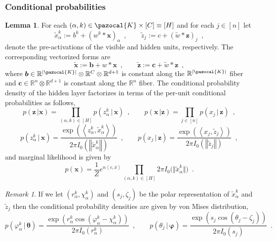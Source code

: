 \documentclass[12pt]{article}
\theoremstyle{definition}%
\newtheorem{lem}[thm]{Lemma}
\theoremstyle{definition}
\theoremstyle{remark}
\newtheorem*{remk}{Remark}
\begin{document}
\subsubsection{Conditional probabilities}
\begin{lem}\label{prop:conv_conditional}
For each $(\alpha , k) \in \pazocal{K} \times [C] \equiv [H]$ and for each $j \in [n]$ let
\begin{equation}
\tilde{x}_\alpha^k := b^k + (w^k \ast \bm{x})_\alpha \enspace , \quad \quad \tilde{z}_j := c + (\tilde{w} \ast \bm{z})_j \enspace ,
\end{equation}
denote the pre-activations of the visible and hidden units, respectively. The corresponding vectorized forms are
\begin{equation}
	\tilde{\bm{x}} := \bm{b} + w\ast \bm{x} \enspace , \quad \quad \tilde{\bm{z}} := \bm{c} + \tilde{w} \ast \bm{z} \enspace ,
\end{equation}
where $\bm{b} \in \mathbb{R}^{|\pazocal{K}|} \otimes \mathbb{R}^C \otimes \mathbb{R}^{d+1}$ is constant along the $\mathbb{R}^{|\pazocal{K}|}$ fiber and $\bm{c} \in \mathbb{R}^n \otimes \mathbb{R}^{d+1}$ is constant along the $\mathbb{R}^n$ fiber.
The conditional probability density of the hidden layer factorizes in terms of the per-unit conditional probabilities as follows,
\begin{equation}
	p(\bm{z} \, | \bm{x}) = \prod_{(\alpha, k) \in [H]} p(z_\alpha^k \, | \, \bm{x}) \enspace , \quad \quad p(\bm{x} \, | \bm{z}) = \prod_{j \in [n]} p(x_j \, | \, \bm{z}) \enspace ,
\end{equation}
\begin{equation}
	p(z_\alpha^k \, | \, \bm{x}) = \frac{\exp\left(\left\langle z_\alpha^k, \tilde{x}_\alpha^k  \right\rangle \right)}{2 \pi I_0\left(\left\Vert \tilde{x}_\alpha^k  \right\Vert\right)} \enspace , \quad \quad p(x_j \, | \, \bm{z}) = \frac{\exp\left(\left\langle x_j, \tilde{z}_j  \right\rangle \right)}{2 \pi I_0\left(\left\Vert \tilde{z}_j \right\Vert\right)} \enspace ,
\end{equation}
and marginal likelihood is given by
\begin{equation}
p(\bm{x}) = \frac{1}{Z} e^{n \left\langle c, \bar{x} \right\rangle } \prod_{(\alpha, k) \in [H]} 2\pi I_0\big(\big\Vert \tilde{x}_\alpha^k \big\Vert\big) \enspace .
\end{equation}
\end{lem}
\begin{remk}
If we let $(r_\alpha^k, \chi_\alpha^k)$ and $(s_j, \zeta_j)$ be the polar representation of $\tilde{x}_\alpha^k$ and $\tilde{z}_j$ then the conditional probability densities are given by von Mises distribution,
\begin{equation}
	p(\varphi_\alpha^k \, | \, \bm{\theta}) = \frac{\exp \left(r_\alpha^k \cos(\varphi_\alpha^k - \chi_\alpha^k) \right)}{2\pi I_0(r_\alpha^k)} \enspace , \quad \quad p(\theta_j \, | \, \bm{\varphi}) = \frac{\exp \left(s_j \cos(\theta_j - \zeta_j) \right)}{2\pi I_0(s_j)} \enspace .
\end{equation}
\end{remk}
\end{document}
